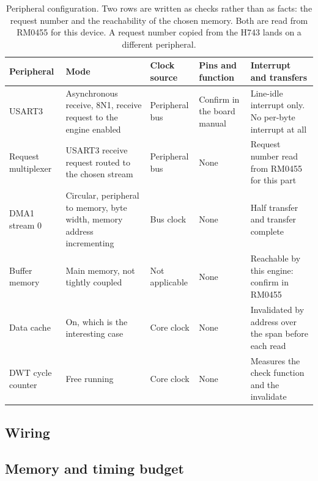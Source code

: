 \begin{table}[H]\centering\small
\begin{tabular}{p{22mm}p{26mm}p{24mm}p{30mm}p{30mm}}
\toprule
Peripheral & Mode & Clock source & Pins and function & Interrupt and transfers \\
\midrule
USART3 & Asynchronous receive, 8N1, receive request to the engine enabled & Peripheral bus & Confirm in the board manual & Line-idle interrupt only. No per-byte interrupt at all \\
Request multiplexer & USART3 receive request routed to the chosen stream & Peripheral bus & None & Request number read from RM0455 for this part \\
DMA1 stream 0 & Circular, peripheral to memory, byte width, memory address incrementing & Bus clock & None & Half transfer and transfer complete \\
Buffer memory & Main memory, not tightly coupled & Not applicable & None & Reachable by this engine: confirm in RM0455 \\
Data cache & On, which is the interesting case & Core clock & None & Invalidated by address over the span before each read \\
DWT cycle counter & Free running & Core clock & None & Measures the check function and the invalidate \\
\bottomrule
\end{tabular}
\caption{Peripheral configuration. Two rows are written as checks rather than as facts: the request number and the reachability of the chosen memory. Both are read from RM0455 for this device. A request number copied from the H743 lands on a different peripheral.}
\end{table}

\subsection*{Wiring}


\subsection*{Memory and timing budget}


